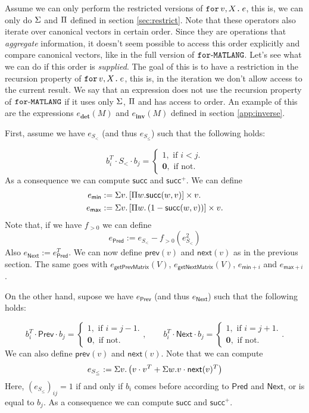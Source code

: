 Assume we can only perform the restricted versions of $\texttt{for}\, v,X \texttt{.}\, e$, this is, we can only do 
$\Sigma$ and $\Pi$ defined in section \ref{sec:restrict}. Note that these operators also iterate over canonical vectors
in certain order. Since they are operations that \textit{aggregate} information, it doesn't seem
possible to access this order explicitly and compare canonical vectors, like in the full version of $\texttt{for}\text{-}\texttt{MATLANG}$.
Let's see what we can do if this order is \textit{supplied}. 
The goal of this is to have a restriction in the recursion property of $\texttt{for}\, v,X \texttt{.}\, e$, this is, 
in the iteration we don't allow access to the current result.
We say that an expression does not use the recursion property of $\texttt{for}\text{-}\texttt{MATLANG}$ if it uses
only $\Sigma$, $\Pi$ and has access to order.
An example of this are the expressions $e_{\mathbf{det}}(M)$ and $e_{\mathbf{inv}}(M)$ defined 
in section \ref{app:inverse}.

First, assume we have $e_{S_{<}}$ (and thus $e_{S_{\leq}}$) such that the following holds:

$$
b_i^T\cdot S_{<} \cdot b_j=\begin{cases}
               1, \text{ if } i < j.\\
              \mathbf{0}, \text{ if not.}
            \end{cases}
$$
As a consequence we
can compute $\mathsf{succ}$ and $\mathsf{succ}^+$. We can define
\begin{align*}
  e_{\mathsf{min}}&:=\Sigma v. \left[ \Pi w. \mathsf{succ}(w,v)\right] \times v. \\
  e_{\mathsf{max}}&:=\Sigma v. \left[ \Pi w. \left( 1-\mathsf{succ}(w,v) \right) \right] \times v.
\end{align*}
Note that, if we have $f_{>0}$ we can define
$$
e_{\mathsf{Pred}}:= e_{S_{<}}- f_{>0}(e_{S_{<}}^2)
$$
Also $e_{\mathsf{Next}}:=e_{\mathsf{Pred}}^T$.
We can now define $\mathsf{prev}(v)$ and $\mathsf{next}(v)$ as in the previous section. 
The same goes with $e_{\mathsf{getPrevMatrix}}(V)$, 
$e_{\mathsf{getNextMatrix}}(V)$, $e_{\mathsf{min}+i}$ and $e_{\mathsf{max}+i}$.

On the other hand, supose we have $e_{\mathsf{Prev}}$
(and thus $e_{\mathsf{Next}}$) such that the following holds:

$$
b_i^T\cdot \mathsf{Prev} \cdot b_j=\begin{cases}
               1, \text{ if } i = j-1.\\
              \mathbf{0}, \text{ if not.}
            \end{cases},
\hspace{2em}b_i^T\cdot \mathsf{Next} \cdot b_j=\begin{cases}
               1, \text{ if } i=j+1.\\
              \mathbf{0}, \text{ if not.}
            \end{cases}.
$$
We can also define $\mathsf{prev}(v)$ and $\mathsf{next}(v)$.
Note that we can compute
$$
e_{S_{\leq}}:=\Sigma v. \left( v\cdot v^T + \Sigma w. v\cdot\mathsf{next}(v)^T \right)
$$
Here, $(e_{S_{\leq}})_{ij}=1$ if and only if $b_i$ comes 
before according to $\mathsf{Pred}$ and $\mathsf{Next}$, or is equal to $b_j$. As a consequence we
can compute $\mathsf{succ}$ and $\mathsf{succ}^+$.

